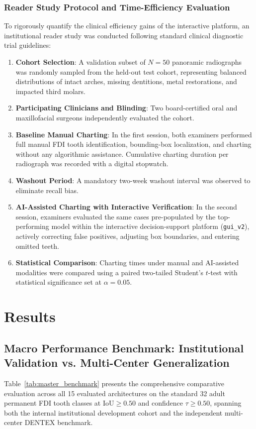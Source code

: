 \documentclass[10pt,journal,compsoc]{IEEEtran}
\begin{document}
\subsubsection{Reader Study Protocol and Time-Efficiency Evaluation}
\label{sec:reader_study_protocol}
To rigorously quantify the clinical efficiency gains of the interactive platform, an institutional reader study was conducted following standard clinical diagnostic trial guidelines:
\begin{enumerate}
    \item \textbf{Cohort Selection}: A validation subset of $N=50$ panoramic radiographs was randomly sampled from the held-out test cohort, representing balanced distributions of intact arches, missing dentitions, metal restorations, and impacted third molars.
    \item \textbf{Participating Clinicians and Blinding}: Two board-certified oral and maxillofacial surgeons independently evaluated the cohort.
    \item \textbf{Baseline Manual Charting}: In the first session, both examiners performed full manual FDI tooth identification, bounding-box localization, and charting without any algorithmic assistance. Cumulative charting duration per radiograph was recorded with a digital stopwatch.
    \item \textbf{Washout Period}: A mandatory two-week washout interval was observed to eliminate recall bias.
    \item \textbf{AI-Assisted Charting with Interactive Verification}: In the second session, examiners evaluated the same cases pre-populated by the top-performing model within the interactive decision-support platform (\texttt{gui\_v2}), actively correcting false positives, adjusting box boundaries, and entering omitted teeth.
    \item \textbf{Statistical Comparison}: Charting times under manual and AI-assisted modalities were compared using a paired two-tailed Student's $t$-test with statistical significance set at $\alpha = 0.05$.
\end{enumerate}

\section{Results}
\label{sec:results}

\subsection{Macro Performance Benchmark: Institutional Validation vs. Multi-Center Generalization}
Table~\ref{tab:master_benchmark} presents the comprehensive comparative evaluation across all 15 evaluated architectures on the standard 32 adult permanent FDI tooth classes at $\text{IoU} \ge 0.50$ and confidence $\tau \ge 0.50$, spanning both the internal institutional development cohort and the independent multi-center DENTEX benchmark.
\end{document}
